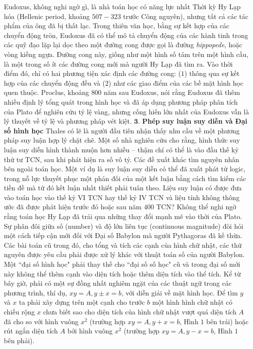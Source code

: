 \begin{multicols}{2}
	\vskip 0.1cm
	Eudoxus, không nghi ngờ gì, là nhà toán học có năng lực nhất Thời kỳ Hy Lạp hóa (Hellenic period, khoảng $507 - 323$ trước Công nguyên), nhưng tất cả các tác phẩm của ông đã bị thất lạc. Trong thiên văn học, bằng sự kết hợp của các chuyển động tròn, Eudoxus đã có thể mô tả chuyển động của các hành tinh trong các quỹ đạo lặp lại dọc theo một đường cong được gọi là đường {\em hippopede}, hoặc vòng kiềng ngựa. Đường cong này, giống như một hình số tám trên một hình cầu, là một trong số ít các đường cong mới mà người Hy Lạp đã tìm ra. Vào thời điểm đó, chỉ có hai phương tiện xác định các đường cong: ($1$) thông qua sự kết hợp của các chuyển động đều và ($2$) như các giao điểm của các bề mặt hình học quen thuộc. 
	\vskip 0.1cm
	Proclus, khoảng $800$ năm sau Eudoxus, nói rằng Eudoxus đã thêm nhiều định lý tổng quát trong hình học và đã áp dụng phương pháp phân tích của Plato để nghiên cứu tỷ lệ vàng, nhưng cống hiến lớn nhất của  Eudoxus vẫn là lý thuyết về tỷ lệ và phương pháp vét kiệt.
	\vskip 0.1cm
	$\pmb{3.}$ \textbf{\color{lichsutoanhoc}Phép suy luận suy diễn và Đại số hình học}
	\vskip 0.1cm 
	Thales có lẽ là người đầu tiên nhận thấy nhu cầu về một phương pháp suy luận hợp lý chặt chẽ. Một số nhà nghiên cứu cho rằng, hình thức suy luận suy diễn hình thành muộn hơn nhiều -- thậm chí có thể là vào đầu thế kỷ thứ tư TCN, sau khi phát hiện ra số vô tỷ. 
	\vskip 0.1cm
	Các đề xuất khác tìm nguyên nhân bên ngoài toán học. Một ví dụ là suy luận suy diễn có thể đã xuất phát từ logic, trong nỗ lực thuyết phục một phản đối của một kết luận bằng cách tìm kiếm các tiền đề mà từ đó kết luận nhất thiết phải tuân theo.
	\vskip 0.1cm
	Liệu suy luận có được đưa vào toán học vào thế kỷ VI TCN hay thế kỷ IV TCN và liệu tính không thông ước đã được phát hiện trước đó hoặc sau năm $400$ TCN? Không thể nghi ngờ rằng toán học Hy Lạp đã trải qua những thay đổi mạnh mẽ vào thời của Plato. Sự phân đôi giữa số (number) và độ lớn liên tục (continuous magnitude) đòi hỏi một cách tiếp cận mới đối với Đại số Babylon mà người Pythagoras đã kế thừa.
	\vskip 0.1cm
	Các bài toán cũ trong đó, cho tổng và tích các cạnh của hình chữ nhật, các thứ nguyên được yêu cầu phải được xử lý khác với thuật toán số của người Babylon. 
	\vskip 0.1cm
	Một ``đại số hình học" phải thay thế cho ``đại số số học" cũ và trong đại số mới này không thể  thêm cạnh vào diện tích hoặc thêm diện tích vào thể tích.
	\vskip 0.1cm
	Kể từ bây giờ, phải có một sự đồng nhất nghiêm ngặt của các thuật ngữ trong các phương trình, thí dụ, $xy = A, y \pm x = b$, với diễn giải về mặt hình học. Để tìm $y$ và $x$  ta phải xây dựng trên một cạnh cho trước $b$  một hình hình chữ nhật có chiều rộng $x$  chưa biết sao cho diện tích của hình chữ nhật vượt quá diện tích $A$  đã cho so với hình vuông  $x^2$ (trường hợp $xy = A, y + x = b$, Hình $1$ bên trái) hoặc rút ngắn diện tích  $A$ bởi hình vuông  $x^2$ (trường hợp $xy = A, y - x = b$,  Hình $1$ bên phải). 

\end{multicols}
